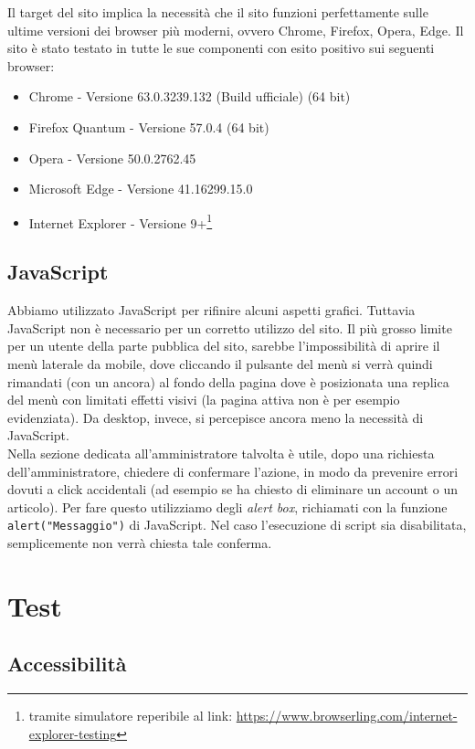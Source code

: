 \documentclass[12pt]{article}
\newcommand{\code}[1]{\texttt{#1}}
\begin{document}
	Il target del sito implica la necessità che il sito funzioni perfettamente sulle ultime versioni dei browser più moderni, ovvero Chrome, Firefox, Opera, Edge. Il sito è stato testato in tutte le sue componenti con esito positivo sui seguenti browser:
	
	\begin{itemize}
		\item Chrome - Versione 63.0.3239.132 (Build ufficiale) (64 bit)
		\item Firefox Quantum - Versione 57.0.4 (64 bit)
		\item Opera - Versione 50.0.2762.45 
		\item Microsoft Edge - Versione 41.16299.15.0
		\item Internet Explorer - Versione 9+\footnote{tramite simulatore reperibile al link: \url{https://www.browserling.com/internet-explorer-testing}}
	\end{itemize} 

	\subsection{JavaScript}
	Abbiamo utilizzato JavaScript per rifinire alcuni aspetti grafici. Tuttavia JavaScript non è necessario per un corretto utilizzo del sito. Il più grosso limite per un utente della parte pubblica del sito, sarebbe l'impossibilità di aprire il menù laterale da mobile, dove cliccando il pulsante del menù si verrà quindi rimandati (con un ancora) al fondo della pagina dove è posizionata una replica del menù con limitati effetti visivi (la pagina attiva non è per esempio evidenziata). Da desktop, invece, si percepisce ancora meno la necessità di JavaScript.\\ 
	Nella sezione dedicata all'amministratore talvolta è utile, dopo una richiesta dell'amministratore, chiedere di confermare l'azione, in modo da prevenire errori dovuti a click accidentali (ad esempio se ha chiesto di eliminare un account o un articolo). Per fare questo utilizziamo degli \textit{alert box}, richiamati con la funzione \code{alert("Messaggio")} di JavaScript. Nel caso l'esecuzione di script sia disabilitata, semplicemente non verrà chiesta tale conferma.
	
	
	
	\section{Test}
	
	\subsection{Accessibilità}
	
\end{document}
